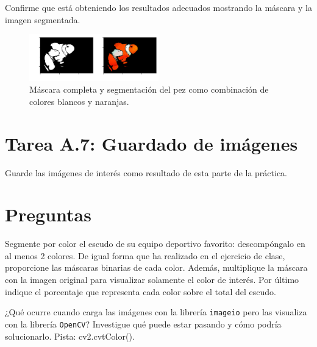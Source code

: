 Confirme que está obteniendo los resultados adecuados mostrando la máscara y la imagen segmentada.


\begin{figure}[h]
    \centering
    \includegraphics[width=0.5\textwidth]{Lab_2/template/figures/output.png}
    \caption{Máscara completa y segmentación del pez como combinación de colores blancos y naranjas.}
    \label{fig:fish_output}
\end{figure}


\section*{Tarea A.7: Guardado de imágenes}

Guarde las imágenes de interés como resultado de esta parte de la práctica.

\section*{Preguntas}

\vspace{5mm}
\begin{tcolorbox}[colback=gray!10, colframe=gray!30, coltitle=black, title=Pregunta A.1, halign=left]
Segmente por color el escudo de su equipo deportivo favorito: descompóngalo en al menos 2 colores. De igual forma que ha realizado en el ejercicio de clase, proporcione las máscaras binarias de cada color. Además, multiplique la máscara con la imagen original para visualizar solamente el color de interés. Por último indique el porcentaje que representa cada color sobre el total del escudo.
\end{tcolorbox}

\vspace{5mm}
\begin{tcolorbox}[colback=gray!10, colframe=gray!30, coltitle=black, title=Pregunta A.2, halign=left]
¿Qué ocurre cuando carga las imágenes con la librería \texttt{imageio} pero las visualiza con la librería \texttt{OpenCV}? Investigue qué puede estar pasando y cómo podría solucionarlo. Pista: cv2.cvtColor().
\end{tcolorbox}